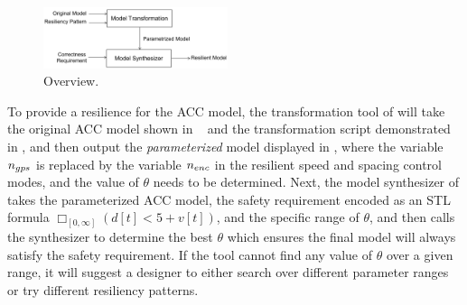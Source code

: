 %
%
%
%
\begin{figure}[t!]%
	\centering%
    \includegraphics[width=0.48\textwidth]{image/overview}%
	\caption{\toolreaffirm Overview.}%
\end{figure}%
%
%

To provide a resilience for the ACC model, the transformation tool of \toolreaffirm will take the original ACC model shown in ~ and the transformation script demonstrated in , and then output the \emph{parameterized} model displayed in , where the variable $n_{gps}$ is replaced by the variable $n_{enc}$ in the resilient speed and spacing control modes, and the value of $\theta$ needs to be determined. Next, the model synthesizer of \toolreaffirm takes the parameterized ACC model, the safety requirement encoded as an STL formula $\Box_{[0, \infty]} (d[t] < 5 + v[t])$, and the specific range of $\theta$, and then calls the synthesizer to determine the best $\theta$ which ensures the final model will always satisfy the safety requirement. If the tool cannot find any value of $\theta$ over a given range, it will suggest a designer to either search over different parameter ranges or try different resiliency patterns.
%
%

